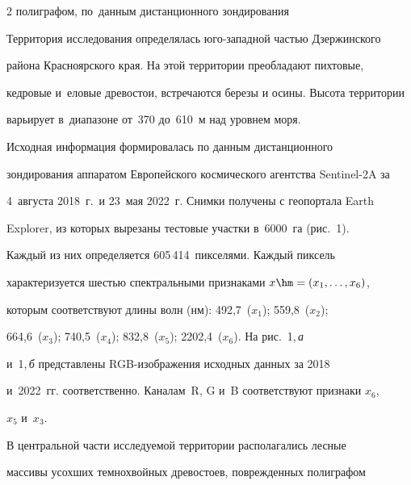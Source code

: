 \begin{multicols}{2}
{полиграфом, по~данным дистанционного зондирования}





\vspace*{-3pt}





  Территория исследования определялась юго-за\-пад\-ной частью Дзержинского 


района Красноярского края. На этой территории преобладают пихтовые, 


кедровые и~еловые древостои, встречаются березы и осины. Высота территории 


варьирует в~диапазоне от~370 до~610~м над уровнем моря.








  


  Исходная информация формировалась по данным дистанционного 


зондирования аппаратом Европейского космического агентства Sentinel-2A за 


4~августа 2018~г.\ и 23~мая 2022~г. Сним\-ки получены с геопортала Earth 


Explorer, из которых вырезаны тестовые участки в~6000~га (рис.~1). 


Каждый из них определяется 605\,414~пикселями. Каждый пиксель 


характеризуется шестью спектральными признаками $x\hm= (x_1, \ldots , x_6)$, 


которым соответствуют длины волн (нм): 492,7~($x_1$); 559,8~($x_2$); 


664,6~($x_3$); 740,5~($x_4$); 832,8~($x_5$); 2202,4~($x_6$). На рис.~1,\,\textit{а} 


и~1,\,\textit{б} представлены RGB-изоб\-ра\-же\-ния исходных данных за 2018 


и~2022~гг. соответственно. Каналам~R, G и~B соответствуют признаки $x_6$, 


$x_5$ и~$x_3$.


  








  


  В центральной части исследуемой территории располагались лесные 


массивы усохших темнохвойных древостоев, поврежденных полиграфом 



\end{multicols}
